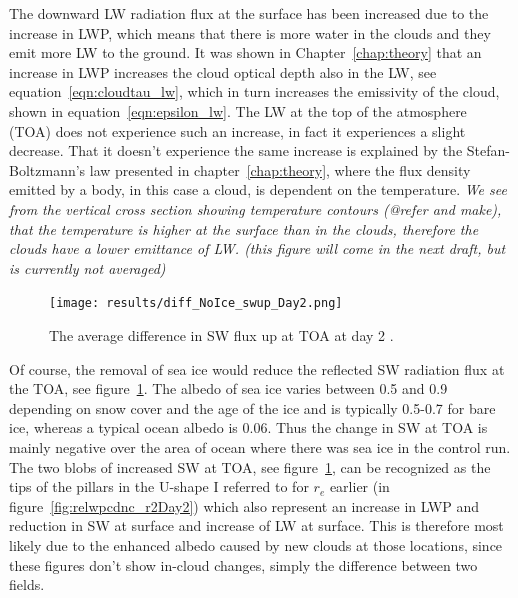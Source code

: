 The downward LW radiation flux at the surface has been increased due to the increase in LWP, which means that there is more water in the clouds and they emit more LW to the ground. It was shown in Chapter~\ref{chap:theory} that an increase in LWP increases the cloud optical depth also in the LW, see equation~\ref{eqn:cloudtau_lw}, which in turn increases the emissivity of the cloud, shown in equation~\ref{eqn:epsilon_lw}. The LW at the top of the atmosphere (TOA) does not experience such an increase, in fact it experiences a slight decrease. That it doesn't experience the same increase is explained by the Stefan-Boltzmann's law presented in chapter~\ref{chap:theory}, where the flux density emitted by a body, in this case a cloud, is dependent on the temperature. %
\textit{ We see from the vertical cross section showing temperature contours (@refer and make), that the temperature is higher at the surface than in the clouds, therefore the clouds have a lower emittance of LW. (this figure will come in the next draft, but is currently not averaged)}

\begin{figure}
\centering
\texttt{[image: results/diff\_NoIce\_swup\_Day2.png]}
\caption{The average difference in SW flux up at TOA at day 2 .}
\label{fig:swupdiff_r2Day2}
\end{figure}
Of course, the removal of sea ice would reduce the reflected SW radiation flux at the TOA, see figure~\ref{fig:swupdiff_r2Day2}. The albedo of sea ice varies between 0.5 and 0.9 depending on snow cover and the age of the ice and is typically 0.5-0.7 for bare ice, whereas a typical ocean albedo is 0.06. Thus the change in SW at TOA is mainly negative over the area of ocean where there was sea ice in the control run. The two blobs of increased SW at TOA, see figure~\ref{fig:swupdiff_r2Day2}, can be recognized as the tips of the pillars in the U-shape I referred to for $r_e$ earlier (in figure~\ref{fig:relwpcdnc_r2Day2}) which also represent an increase in LWP and reduction in SW at surface and increase of LW at surface. This is therefore most likely due to the enhanced albedo caused by new clouds at those locations, since these figures don't show in-cloud changes, simply the difference between two fields.

